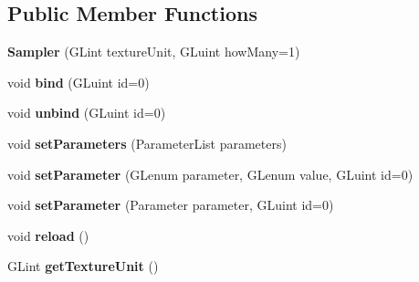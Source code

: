 \subsection*{Public Member Functions}
\begin{DoxyCompactItemize}
\item 
{\bfseries Sampler} (G\+Lint texture\+Unit, G\+Luint how\+Many=1)\hypertarget{classflw_1_1flc_1_1Sampler_a20a25067b0f6dfbd2d99c2cb2d6db968}{}\label{classflw_1_1flc_1_1Sampler_a20a25067b0f6dfbd2d99c2cb2d6db968}

\item 
void {\bfseries bind} (G\+Luint id=0)\hypertarget{classflw_1_1flc_1_1Sampler_ada27f5e46e8e140ab15ed5a543a98bb6}{}\label{classflw_1_1flc_1_1Sampler_ada27f5e46e8e140ab15ed5a543a98bb6}

\item 
void {\bfseries unbind} (G\+Luint id=0)\hypertarget{classflw_1_1flc_1_1Sampler_a4a44bb0d09c8e589cc45d593fda7418d}{}\label{classflw_1_1flc_1_1Sampler_a4a44bb0d09c8e589cc45d593fda7418d}

\item 
void {\bfseries set\+Parameters} (Parameter\+List parameters)\hypertarget{classflw_1_1flc_1_1Sampler_aa44590d3fa5425a730d5fd9740c2122a}{}\label{classflw_1_1flc_1_1Sampler_aa44590d3fa5425a730d5fd9740c2122a}

\item 
void {\bfseries set\+Parameter} (G\+Lenum parameter, G\+Lenum value, G\+Luint id=0)\hypertarget{classflw_1_1flc_1_1Sampler_a14586c2d0807a06f4ff0da1b099b39df}{}\label{classflw_1_1flc_1_1Sampler_a14586c2d0807a06f4ff0da1b099b39df}

\item 
void {\bfseries set\+Parameter} (Parameter parameter, G\+Luint id=0)\hypertarget{classflw_1_1flc_1_1Sampler_ad0617f6aaa4688fb325b0620fb29a960}{}\label{classflw_1_1flc_1_1Sampler_ad0617f6aaa4688fb325b0620fb29a960}

\item 
void {\bfseries reload} ()\hypertarget{classflw_1_1flc_1_1Sampler_aa08785699a68a5cd1a25585be962e0f0}{}\label{classflw_1_1flc_1_1Sampler_aa08785699a68a5cd1a25585be962e0f0}

\item 
G\+Lint {\bfseries get\+Texture\+Unit} ()\hypertarget{classflw_1_1flc_1_1Sampler_ae51636bb9368bbfce44b606312bd27d6}{}\label{classflw_1_1flc_1_1Sampler_ae51636bb9368bbfce44b606312bd27d6}

\end{DoxyCompactItemize}
